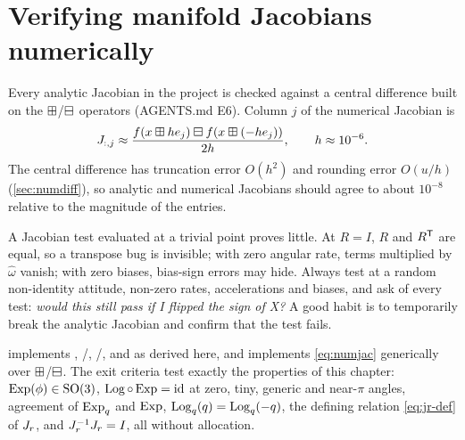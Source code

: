 \section{Verifying manifold Jacobians numerically}
\label{sec:numjac}

Every analytic Jacobian in the project is checked against a central difference built on the
$\boxplus$/$\boxminus$ operators (AGENTS.md E6). Column $j$ of the numerical Jacobian is
\begin{equation}
  J_{:,j} \approx \frac{ f(x\boxplus h e_j) \boxminus f(x\boxplus(-h e_j)) }{2h},
  \qquad h \approx 10^{-6}.
  \label{eq:numjac}
\end{equation}
The central difference has truncation error $O(h^2)$ and rounding error $O(u/h)$
(\cref{sec:numdiff}), so analytic and numerical Jacobians should agree to about $10^{-8}$ relative
to the magnitude of the entries.

\begin{pitfall}
A Jacobian test evaluated at a trivial point proves little. At $R = I$, $R$ and $R^{\mathsf{T}}$ are equal, so a
transpose bug is invisible; with zero angular rate, terms multiplied by $\hat\omega$ vanish; with zero
biases, bias-sign errors may hide. Always test at a random non-identity attitude, non-zero rates,
accelerations and biases, and ask of every test: \emph{would this still pass if I flipped the sign of
X?} A good habit is to temporarily break the analytic Jacobian and confirm that the test fails.
\end{pitfall}

\begin{projectlink}[Milestone 2]
 implements , /, /,  and
 as derived here, and  implements \eqref{eq:numjac} generically
over $\boxplus$/$\boxminus$. The exit criteria test exactly the properties of this chapter: $\operatorname{Exp}(\phi) \in \mathrm{SO}(3)$,
$\operatorname{Log}\circ\operatorname{Exp} = \mathrm{id}$ at zero, tiny, generic and near-$\pi$ angles, agreement of $\operatorname{Exp}_q$ and $\operatorname{Exp}$,
$\operatorname{Log}_q(q) = \operatorname{Log}_q(-q)$, the defining relation \eqref{eq:jr-def} of $J_r$, and $J_r^{-1}J_r = I$, all
without allocation.
\end{projectlink}

